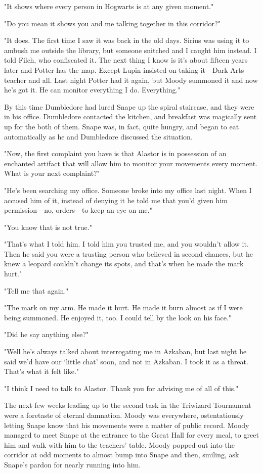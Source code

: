 "It shows where every person in Hogwarts is at any given moment."

"Do you mean it shows you and me talking together in this corridor?"

"It does. The first time I saw it was back in the old days. Sirius was using it to ambush me outside the library, but someone snitched and I caught him instead. I told Filch, who confiscated it. The next thing I know is it's about fifteen years later and Potter has the map. Except Lupin insisted on taking it—Dark Arts teacher and all. Last night Potter had it again, but Moody summoned it and now he's got it. He can monitor everything I do. Everything."

By this time Dumbledore had lured Snape up the spiral staircase, and they were in his office. Dumbledore contacted the kitchen, and breakfast was magically sent up for the both of them. Snape was, in fact, quite hungry, and began to eat automatically as he and Dumbledore discussed the situation.

"Now, the first complaint you have is that Alastor is in possession of an enchanted artifact that will allow him to monitor your movements every moment. What is your next complaint?"

"He's been searching my office. Someone broke into my office last night. When I accused him of it, instead of denying it he told me that you'd given him permission—no, orders—to keep an eye on me."

"You know that is not true."

"That's what I told him. I told him you trusted me, and you wouldn't allow it. Then he said you were a trusting person who believed in second chances, but he knew a leopard couldn't change its spots, and that's when he made the mark hurt."

"Tell me that again."

"The mark on my arm. He made it hurt. He made it burn almost as if I were being summoned. He enjoyed it, too. I could tell by the look on his face."

"Did he say anything else?"

"Well he's always talked about interrogating me in Azkaban, but last night he said we'd have our `little chat' soon, and not in Azkaban. I took it as a threat. That's what it felt like."

"I think I need to talk to Alastor. Thank you for advising me of all of this."

The next few weeks leading up to the second task in the Triwizard Tournament were a foretaste of eternal damnation. Moody was everywhere, ostentatiously letting Snape know that his movements were a matter of public record. Moody managed to meet Snape at the entrance to the Great Hall for every meal, to greet him and walk with him to the teachers' table. Moody popped out into the corridor at odd moments to almost bump into Snape and then, smiling, ask Snape's pardon for nearly running into him.

